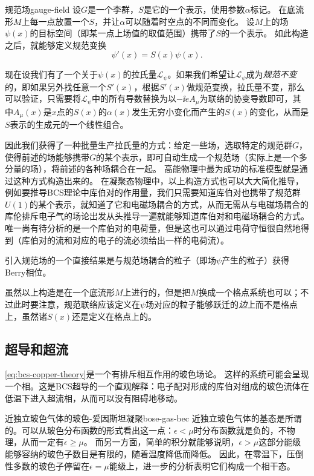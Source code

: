 \begin{back}{规范场}{gauge-field}
    设$G$是一个李群，$S$是它的一个表示，使用参数$\alpha$标记。
    在底流形$M$上每一点放置一个$S$，并让$\alpha$可以随着时空点的不同而变化。
    设$M$上的场$\psi(x)$的目标空间（即某一点上场值的取值范围）携带了$S$的一个表示。
    如此构造之后，就能够定义规范变换
    \[
        \psi'(x) = S(x) \psi(x).
    \]

    现在设我们有了一个关于$\psi(x)$的拉氏量$\mathcal{L}_{\psi}$。如果我们希望让$\mathcal{L}_{\psi}$成为\emph{规范不变}的，即如果另外找任意一个$S'(x)$，根据$S'(x)$做规范变换，拉氏量不变，那么可以验证，只需要将$\mathcal{L}_{\psi}$中的所有导数替换为以$-\ii e A_\mu$为联络的协变导数即可，其中$A_\mu(x)$是$x$点的$S(x)$的$\alpha(x)$发生无穷小变化而产生的$S(x)$的变化，从而是$S$表示的生成元的一个线性组合。

    因此我们获得了一种批量生产拉氏量的方式：给定一些场，选取特定的规范群$G$，使得前述的场能够携带$G$的某个表示，即可自动生成一个规范场（实际上是一个多分量的场），将前述的各种场耦合在一起。
    高能物理中最为成功的标准模型就是通过这种方式构造出来的。
    在凝聚态物理中，以上构造方式也可以大大简化推导，例如要推导BCS理论中库伯对的作用量，我们只需要知道库伯对也携带了规范群$U(1)$的某个表示，就知道了它和电磁场耦合的方式，从而无需从与电磁场耦合的库伦排斥电子气的场论出发从头推导一遍就能够知道库伯对和电磁场耦合的方式。
    唯一尚有待分析的是一个库伯对的电荷量，但是这也可以通过电荷守恒很自然地得到（库伯对的流和对应的电子的流必须给出一样的电荷流）。

    引入规范场的一个直接结果是与规范场耦合的粒子（即场$\psi$产生的粒子）获得Berry相位。

    虽然以上构造是在一个底流形$M$上进行的，但是把$M$换成一个格点系统也可以；不过此时要注意，规范联络应该定义在$\psi$场对应的粒子能够跃迁的\emph{边}上而不是格点上，虽然诸$S(x)$还是定义在格点上的。
\end{back}

\subsection{超导和超流}

\eqref{eq:bcs-copper-theory}是一个有排斥相互作用的玻色场论。
这样的系统可能会呈现一个相。这是BCS超导的一个直观解释：电子配对形成的库伯对组成的玻色流体在低温下进入超流相，从而可以没有阻碍地移动。

\begin{back}{近独立玻色气体的玻色-爱因斯坦凝聚}{bose-gas-bec}
    近独立玻色气体的基态是所谓的。可以从玻色分布函数的形式看出这一点：$\epsilon < \mu$时分布函数就是负的，不物理，从而一定有$\epsilon \geq \mu$。
    而另一方面，简单的积分就能够说明，$\epsilon > \mu$这部分能级能够容纳的玻色子数目是有限的，随着温度降低而降低。
    因此，在零温下，压倒性多数的玻色子停留在$\epsilon = \mu$能级上，进一步的分析表明它们构成一个相干态。
\end{back}

